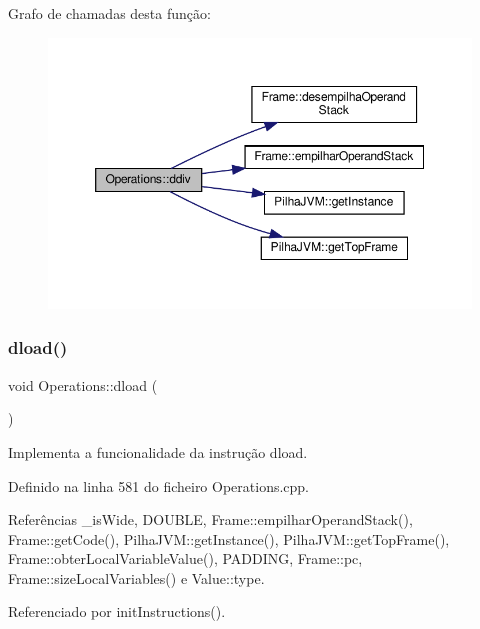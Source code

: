 Grafo de chamadas desta função\+:\nopagebreak
\begin{figure}[H]
\begin{center}
\leavevmode
\includegraphics[width=350pt]{classOperations_a3c323c9f0d40e68bf54cd449a55618c3_cgraph}
\end{center}
\end{figure}
\mbox{\label{classOperations_af53b0b32da7737741c20b4e313eaac84}} 
\subsubsection{\texorpdfstring{dload()}{dload()}}
{\footnotesize\ttfamily void Operations\+::dload (\begin{DoxyParamCaption}{ }\end{DoxyParamCaption})\hspace{0.3cm}{\ttfamily [private]}}



Implementa a funcionalidade da instrução dload. 



Definido na linha 581 do ficheiro Operations.\+cpp.



Referências \+\_\+is\+Wide, D\+O\+U\+B\+LE, Frame\+::empilhar\+Operand\+Stack(), Frame\+::get\+Code(), Pilha\+J\+V\+M\+::get\+Instance(), Pilha\+J\+V\+M\+::get\+Top\+Frame(), Frame\+::obter\+Local\+Variable\+Value(), P\+A\+D\+D\+I\+NG, Frame\+::pc, Frame\+::size\+Local\+Variables() e Value\+::type.



Referenciado por init\+Instructions().

